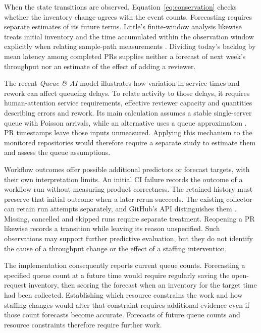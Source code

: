 \documentclass[11pt,a4paper]{article}
\begin{document}
When the state transitions are observed, Equation~\eqref{eq:conservation} checks whether the inventory change agrees with the event counts. Forecasting requires separate estimates of its future terms. Little's finite-window analysis likewise treats initial inventory and the time accumulated within the observation window explicitly when relating sample-path measurements \citep[Sections 2.1--2.3]{little2011}. Dividing today's backlog by mean latency among completed PRs supplies neither a forecast of next week's throughput nor an estimate of the effect of adding a reviewer.

The recent \emph{Queue \& AI} model illustrates how variation in service times and rework can affect queueing delays. To relate activity to those delays, it requires human-attention service requirements, effective reviewer capacity and quantities describing errors and rework. Its main calculation assumes a stable single-server queue with Poisson arrivals, while an alternative uses a queue approximation \citep[Sections 2.1, 3 and 4.2]{bartolucci2026}. PR timestamps leave those inputs unmeasured. Applying this mechanism to the monitored repositories would therefore require a separate study to estimate them and assess the queue assumptions.

Workflow outcomes offer possible additional predictors or forecast targets, with their own interpretation limits. An initial CI failure records the outcome of a workflow run without measuring product correctness. The retained history must preserve that initial outcome when a later rerun succeeds. The existing collector can retain run attempts separately, and GitHub's API distinguishes them \citep{githubattempts}. Missing, cancelled and skipped runs require separate treatment. Reopening a PR likewise records a transition while leaving its reason unspecified. Such observations may support further predictive evaluation, but they do not identify the cause of a throughput change or the effect of a staffing intervention.

The implementation consequently reports current queue counts. Forecasting a specified queue count at a future time would require regularly saving the open-request inventory, then scoring the forecast when an inventory for the target time had been collected. Establishing which resource constrains the work and how staffing changes would alter that constraint requires additional evidence even if those count forecasts become accurate. Forecasts of future queue counts and resource constraints therefore require further work.
\end{document}
